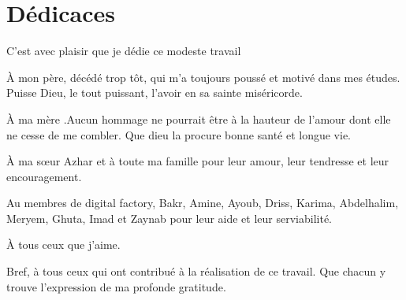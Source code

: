 \chapter*{D\'edicaces}

\begin{center}

C'est avec plaisir que je d\'edie ce modeste travail

\vspace{1.5\baselineskip}

\`A mon p\`ere, d\'ec\'ed\'e trop t\^ot, qui m'a toujours pouss\'e et motiv\'e dans mes \'etudes. Puisse Dieu, le tout puissant, l'avoir en sa sainte mis\'ericorde.

\vspace{1.5\baselineskip}

\`A ma m\`ere .Aucun hommage ne pourrait \^etre \`a la hauteur de l'amour dont elle ne cesse de me combler. Que dieu la procure bonne sant\'e et longue vie.

\vspace{1.5\baselineskip}

\`A ma s\oe{}ur Azhar et \`a toute ma famille pour leur amour, leur tendresse et leur encouragement.

\vspace{1.5\baselineskip}

Au membres de digital factory, Bakr, Amine, Ayoub, Driss, Karima, Abdelhalim, Meryem, Ghuta, Imad et Zaynab pour leur aide et leur serviabilit\'e.

\vspace{1.5\baselineskip}

\`A tous ceux que j'aime.

\vspace{1.5\baselineskip}

Bref, \`a tous ceux qui ont contribu\'e \`a la r\'ealisation de ce travail. Que chacun y trouve l'expression de ma profonde gratitude.

\vspace{1.5\baselineskip}

\end{center}